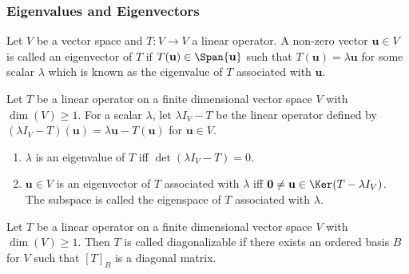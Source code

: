 \documentclass[a4paper]{article}
\begin{document}
\subsubsection*{Eigenvalues and Eigenvectors}
\begin{defi}
Let $V$ be a vector space and $T:V\rightarrow V$ a linear operator. A non-zero vector $\mathbf{u}\in V$ is called an eigenvector of $T$ if $T(\mathbf{u})\in\Span\{\mathbf{u}\}$ such that $T(\mathbf{u})=\lambda\mathbf{u}$ for some scalar $\lambda$ which is known as the eigenvalue of $T$ associated with $\mathbf{u}$.
\end{defi}
\begin{thm}\label{eigenvalue}
Let $T$ be a linear operator on a finite dimensional vector space $V$ with $\dim(V)\geq 1$. For a scalar $\lambda$, let $\lambda I_V-T$ be the linear operator defined by $(\lambda I_V-T)(\mathbf{u})=\lambda\mathbf{u}-T(\mathbf{u})$ for $\mathbf{u}\in V$. 
\begin{enumerate}
    \item $\lambda$ is an eigenvalue of $T$ iff $\det(\lambda I_V-T)=0$.
    \item $\mathbf{u}\in V$ is an eigenvector of $T$ associated with $\lambda$ iff $\boldsymbol{0}\neq\mathbf{u}\in\Ker(T-\lambda I_V)$. The subspace is called the eigenspace of $T$ associated with $\lambda$.
\end{enumerate}
\end{thm}
\begin{defi}[Diagonalizable]
Let $T$ be a linear operator on a finite dimensional vector space $V$ with $\dim(V)\geq1$. Then $T$ is called diagonalizable if there exists an ordered basis $B$ for $V$ such that $[T]_B$ is a diagonal matrix.
\end{defi}
\end{document}
